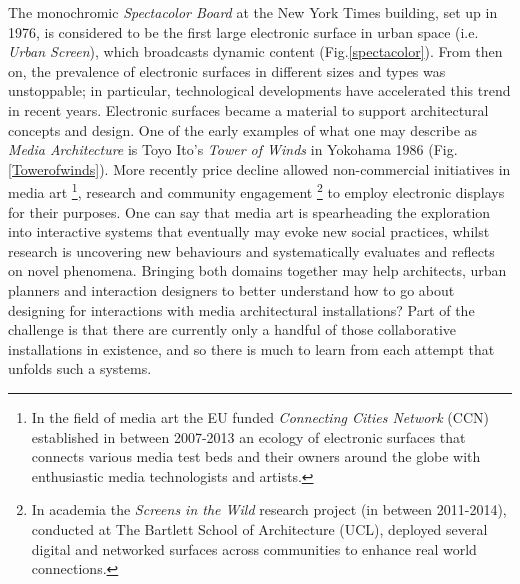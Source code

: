 The monochromic \textit{Spectacolor Board}  at the New York Times building, set up in 1976, is considered to be the first large electronic surface in urban space (i.e. \textit{Urban Screen}), which broadcasts dynamic content (Fig.\ref{spectacolor}). 
From then on, the prevalence of electronic surfaces in different sizes and types was unstoppable; in particular, technological developments have accelerated this trend in recent years. 
Electronic surfaces became a material to support architectural concepts and design. One of the early examples of what one may describe as \textit{Media Architecture} is Toyo Ito's \textit{Tower of Winds}  in Yokohama 1986 (Fig.\ref{Towerofwinds}).  More recently price decline allowed non-commercial initiatives in media art \footnote{In the field of media art the EU funded \textit{Connecting Cities Network} (CCN)  established in between 2007-2013 an ecology of electronic surfaces that connects various media test beds and their owners around the globe with enthusiastic media technologists and artists.}, research and community engagement \footnote{In academia the \textit{Screens in the Wild}  research project (in between 2011-2014), conducted at The Bartlett School of Architecture (UCL), deployed several digital and networked surfaces across communities to enhance real world connections.} to employ electronic displays for their purposes. 
One can say that media art is spearheading the exploration into interactive systems that eventually may evoke new social practices, whilst research is uncovering new behaviours and systematically evaluates and reflects on novel phenomena.
Bringing both domains together may help architects, urban planners and interaction designers to better understand how to go about designing for interactions with media architectural installations? 
Part of the challenge is that there are currently only a handful of those collaborative installations in existence, and so there is much to learn from each attempt that unfolds such a systems. 




